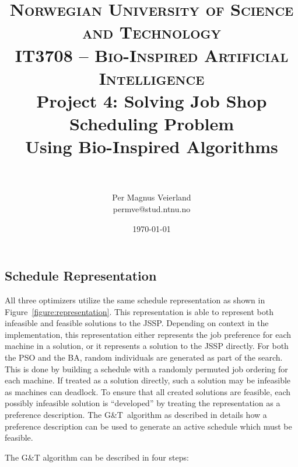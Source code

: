 \documentclass[paper=a4, fontsize=9pt]{scrartcl}
\title{
\vspace{-1cm}
\normalfont \normalsize
\textsc{Norwegian University of Science and Technology\\IT3708 -- Bio-Inspired Artificial Intelligence}
\horrule{0.5pt} \\[0cm]
\Huge Project 4: Solving Job Shop Scheduling Problem\\Using Bio-Inspired Algorithms\\[-0.3cm]
\horrule{2pt} \\[0.1cm]
}
\author{Per Magnus Veierland\\permve@stud.ntnu.no}
\date{\normalsize\today}
\begin{document}
\maketitle

\setlength\columnsep{20pt}

\begin{multicols}{2}



\section*{Schedule Representation}

All three optimizers utilize the same schedule representation as shown in Figure~\ref{figure:representation}. This representation is able to represent both infeasible and feasible solutions to the \ac{JSSP}. Depending on context in the implementation, this representation either represents the job preference for each machine in a solution, or it represents a solution to the \ac{JSSP} directly. For both the \ac{PSO} and the \ac{BA}, random individuals are generated as part of the search. This is done by building a schedule with a randomly permuted job ordering for each machine. If treated as a solution directly, such a solution may be infeasible as machines can deadlock. To ensure that all created solutions are feasible, each possibly infeasible solution is ``developed'' by treating the representation as a preference description. The G\&T~algorithm as described in \cite{sha2006hybrid} details how a preference description can be used to generate an active schedule which must be feasible.

The G\&T algorithm can be described in four steps:


\end{multicols}
\end{document}
